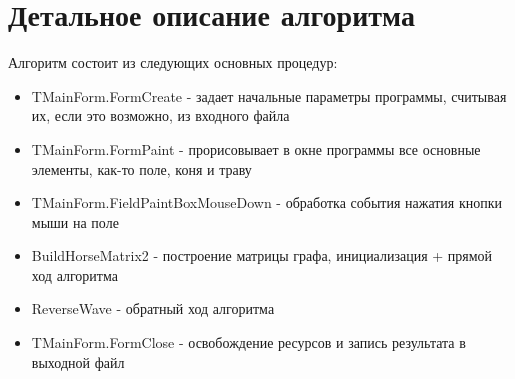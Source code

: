 \section{Детальное описание алгоритма}
\DeclareRobustCommand{\l}[1]{
\item {[}{\it #1}{]} 
}
Алгоритм состоит из следующих основных процедур:
\begin{itemize}
\item TMainForm.FormCreate - задает начальные параметры программы, считывая
их, если это возможно, из входного файла
\item TMainForm.FormPaint - прорисовывает в окне программы все основные
элементы, как-то поле, коня и траву
\item TMainForm.FieldPaintBoxMouseDown - обработка события нажатия кнопки мыши
на поле
\item BuildHorseMatrix2 - построение матрицы графа, инициализация + прямой ход
алгоритма
\item ReverseWave - обратный ход алгоритма 
\item TMainForm.FormClose - освобождение ресурсов и запись результата в
выходной файл
\end{itemize}

